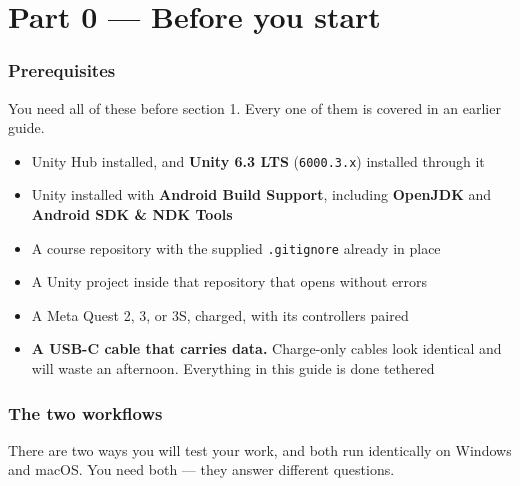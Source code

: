 \documentclass[11pt,a4paper]{article}
\providecommand{\tightlist}{\setlength{\itemsep}{2pt}\setlength{\parskip}{0pt}}
\begin{document}
\clearpage
\part*{Part 0 --- Before you start}

\section*{Prerequisites}\label{prerequisites}

You need all of these before section 1. Every one of them is covered in an earlier guide.

\begin{itemize}
\tightlist
\item
  Unity Hub installed, and \textbf{Unity 6.3 LTS} (\texttt{6000.3.x}) installed through it
\item
  Unity installed with \textbf{Android Build Support}, including \textbf{OpenJDK} and
  \textbf{Android SDK \& NDK Tools}
\item
  A course repository with the supplied \texttt{.gitignore} already in place
\item
  A Unity project inside that repository that opens without errors
\item
  A Meta Quest 2, 3, or 3S, charged, with its controllers paired
\item
  \textbf{A USB-C cable that carries data.} Charge-only cables look identical and will waste
  an afternoon. Everything in this guide is done tethered
\end{itemize}

\section*{The two workflows}\label{the-two-workflows}

There are two ways you will test your work, and both run identically on Windows and
macOS. You need both --- they answer different questions.
\end{document}
